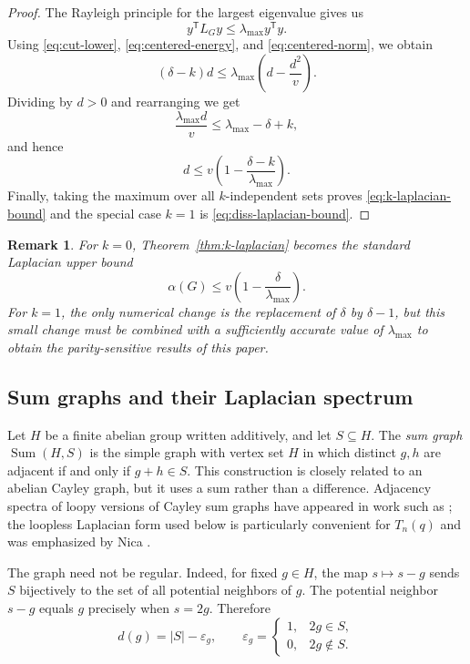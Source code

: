 \documentclass[11pt]{article}
\newtheorem{remark}[theorem]{Remark}
\theoremstyle{definition}
\begin{document}
\begin{proof}
The Rayleigh principle for the largest eigenvalue gives us
\[
  y^{\mathsf T}L_Gy\le\lambda_{\max}y^{\mathsf T}y.
\]
Using \eqref{eq:cut-lower}, \eqref{eq:centered-energy}, and
\eqref{eq:centered-norm}, we obtain
\[
  (\delta-k)d
  \le\lambda_{\max}\left(d-\frac{d^2}{v}\right).
\]
Dividing by $d>0$ and rearranging we get
\[
  \frac{\lambda_{\max}d}{v}
  \le\lambda_{\max}-\delta+k,
\]
and hence
\[
  d\le v\left(1-\frac{\delta-k}{\lambda_{\max}}\right).
\]
Finally, taking the maximum over all $k$-independent sets proves \eqref{eq:k-laplacian-bound} and the special case $k=1$ is \eqref{eq:diss-laplacian-bound}.
\end{proof}

\begin{remark}
For $k=0$, Theorem~\ref{thm:k-laplacian} becomes the standard Laplacian
upper bound
\[
  \alpha(G)\le v\left(1-\frac{\delta}{\lambda_{\max}}\right).
\]
For $k=1$, the only numerical change is the replacement of $\delta$ by
$\delta-1$, but this small change must be combined with a sufficiently
accurate value of $\lambda_{\max}$ to obtain the parity-sensitive results
of this paper.
\end{remark}

\subsection{Sum graphs and their Laplacian spectrum}\label{sec:sum-graphs}

Let $H$ be a finite abelian group written additively, and let $S\subseteq H$.
The \emph{sum graph} $\operatorname{Sum}(H,S)$ is the simple graph with
vertex set $H$ in which distinct $g,h$ are adjacent if and only if
$g+h\in S$.  This construction is closely related to an abelian Cayley
graph, but it uses a sum rather than a difference.  Adjacency spectra of
loopy versions of Cayley sum graphs have appeared in work such as
\cite{li-sum,devos}; the loopless Laplacian form used below is particularly
convenient for $T_n(q)$ and was emphasized by Nica \cite{nica}.

The graph need not be regular.  Indeed, for fixed $g\in H$, the map
$s\mapsto s-g$ sends $S$ bijectively to the set of all potential neighbors
of $g$.  The potential neighbor $s-g$ equals $g$ precisely when $s=2g$.
Therefore
\begin{equation}\label{eq:sum-degree}
  d(g)=|S|-\varepsilon_g,
  \qquad
  \varepsilon_g=
  \begin{cases}
  1,&2g\in S,\\
  0,&2g\notin S.
  \end{cases}
\end{equation}
\end{document}
